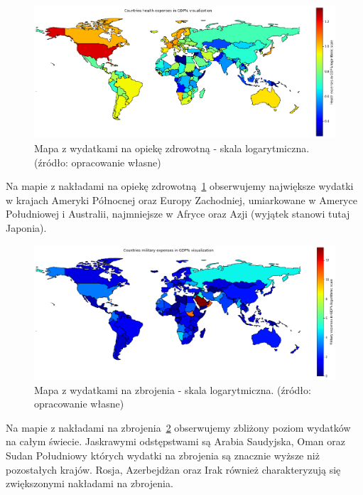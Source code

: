 \documentclass[11pt]{report}
\begin{document}
    \begin{figure}[!htp]
        \centering
        \includegraphics[width=\linewidth]{fig/CLUST/health2015.png}
        \caption{Mapa z wydatkami na opiekę zdrowotną - skala logarytmiczna. (źródło: opracowanie własne)}
        \label{fig:clustHealth2015_log}
    \end{figure}
    Na mapie z nakładami na opiekę zdrowotną~\ref{fig:clustHealth2015_log} obserwujemy największe wydatki w krajach Ameryki Północnej oraz Europy Zachodniej, umiarkowane w Ameryce Południowej i Australii, najmniejsze w Afryce oraz Azji (wyjątek stanowi tutaj Japonia).

    \begin{figure}[!htp]
        \centering
        \includegraphics[width=\linewidth]{fig/CLUST/military2015.png}
        \caption{Mapa z wydatkami na zbrojenia - skala logarytmiczna. (źródło: opracowanie własne)}
        \label{fig:clustMilitary2015_log}
    \end{figure}
    Na mapie z nakładami na zbrojenia~\ref{fig:clustMilitary2015_log} obserwujemy zbliżony poziom wydatków na całym świecie.
    Jaskrawymi odstępstwami są Arabia Saudyjska, Oman oraz Sudan Południowy których wydatki na zbrojenia są znacznie wyższe niż pozostałych krajów.
    Rosja, Azerbejdżan oraz Irak również charakteryzują się zwiększonymi nakładami na zbrojenia.
\end{document}

